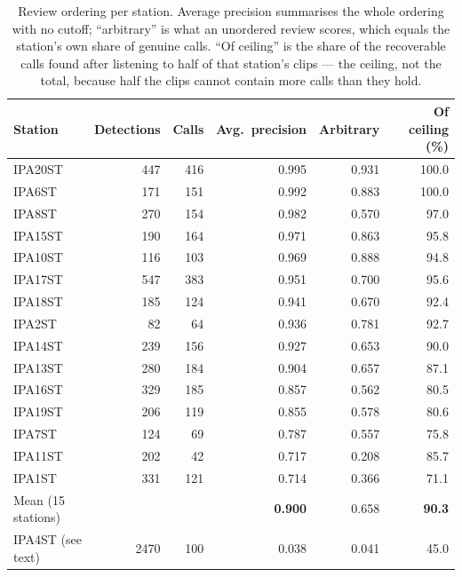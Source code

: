 \documentclass[review,3p,times]{elsarticle}
\begin{document}
\begin{table}[H]
\centering
\caption{Review ordering per station. Average precision summarises the whole
ordering with no cutoff; ``arbitrary'' is what an unordered review scores,
which equals the station's own share of genuine calls. ``Of ceiling'' is the
share of the recoverable calls found after listening to half of that station's
clips --- the ceiling, not the total, because half the clips cannot contain
more calls than they hold.}
\label{tab:ranking}
\begin{tabular}{lrrrrr}
\toprule
Station & Detections & Calls & Avg.\ precision & Arbitrary & Of ceiling (\%) \\
\midrule
IPA20ST &  447 & 416 & 0.995 & 0.931 & 100.0 \\
IPA6ST  &  171 & 151 & 0.992 & 0.883 & 100.0 \\
IPA8ST  &  270 & 154 & 0.982 & 0.570 &  97.0 \\
IPA15ST &  190 & 164 & 0.971 & 0.863 &  95.8 \\
IPA10ST &  116 & 103 & 0.969 & 0.888 &  94.8 \\
IPA17ST &  547 & 383 & 0.951 & 0.700 &  95.6 \\
IPA18ST &  185 & 124 & 0.941 & 0.670 &  92.4 \\
IPA2ST  &   82 &  64 & 0.936 & 0.781 &  92.7 \\
IPA14ST &  239 & 156 & 0.927 & 0.653 &  90.0 \\
IPA13ST &  280 & 184 & 0.904 & 0.657 &  87.1 \\
IPA16ST &  329 & 185 & 0.857 & 0.562 &  80.5 \\
IPA19ST &  206 & 119 & 0.855 & 0.578 &  80.6 \\
IPA7ST  &  124 &  69 & 0.787 & 0.557 &  75.8 \\
IPA11ST &  202 &  42 & 0.717 & 0.208 &  85.7 \\
IPA1ST  &  331 & 121 & 0.714 & 0.366 &  71.1 \\
\midrule
Mean (15 stations) & & & \textbf{0.900} & 0.658 & \textbf{90.3} \\
\midrule
IPA4ST (see text)  & 2470 & 100 & 0.038 & 0.041 & 45.0 \\
\bottomrule
\end{tabular}
\end{table}
\end{document}
